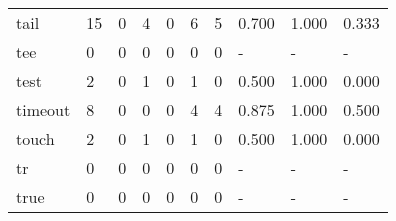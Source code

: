 \begin{longtable}{lp{1.3cm}p{1.3cm}p{1.3cm}p{1.3cm}p{1.3cm}p{1.3cm}p{1.3cm}p{1.3cm}p{1.3cm}}
tail      &                     15 &                                  0 &                                 4 &                                0 &                                 6 &                               5 &                                0.700 &                                  1.000 &                                0.333 \\
tee       &                      0 &                                  0 &                                 0 &                                0 &                                 0 &                               0 &                                    - &                                      - &                                    - \\
test      &                      2 &                                  0 &                                 1 &                                0 &                                 1 &                               0 &                                0.500 &                                  1.000 &                                0.000 \\
timeout   &                      8 &                                  0 &                                 0 &                                0 &                                 4 &                               4 &                                0.875 &                                  1.000 &                                0.500 \\
touch     &                      2 &                                  0 &                                 1 &                                0 &                                 1 &                               0 &                                0.500 &                                  1.000 &                                0.000 \\
tr        &                      0 &                                  0 &                                 0 &                                0 &                                 0 &                               0 &                                    - &                                      - &                                    - \\
true      &                      0 &                                  0 &                                 0 &                                0 &                                 0 &                               0 &                                    - &                                      - &                                    - \\

\end{longtable}
